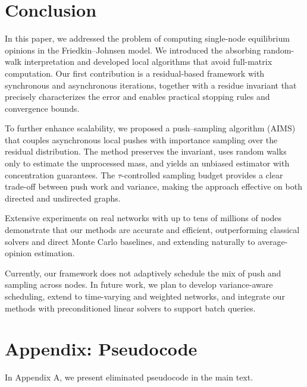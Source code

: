 \documentclass[sigconf,review, nonacm]{acmart}
\begin{document}
\section{Conclusion}\label{sec:conclusion}

In this paper, we addressed the problem of computing single-node equilibrium opinions in the Friedkin--Johnsen model. We introduced the absorbing random-walk interpretation and developed local algorithms that avoid full-matrix computation. Our first contribution is a residual-based framework with synchronous and asynchronous iterations, together with a residue invariant that precisely characterizes the error and enables practical stopping rules and convergence bounds.

To further enhance scalability, we proposed a push--sampling algorithm (AIMS) that couples asynchronous local pushes with importance sampling over the residual distribution. The method preserves the invariant, uses random walks only to estimate the unprocessed mass, and yields an unbiased estimator with concentration guarantees. The $\tau$-controlled sampling budget provides a clear trade-off between push work and variance, making the approach effective on both directed and undirected graphs.

Extensive experiments on real networks with up to tens of millions of nodes demonstrate that our methods are accurate and efficient, outperforming classical solvers and direct Monte Carlo baselines, and extending naturally to average-opinion estimation.

Currently, our framework does not adaptively schedule the mix of push and sampling across nodes. In future work, we plan to develop variance-aware scheduling, extend to time-varying and weighted networks, and integrate our methods with preconditioned linear solvers to support batch queries.

\newpage




\newpage
\appendix

\section{Appendix: Pseudocode}
In Appendix A, we present eliminated pseudocode in the main text.
\end{document}
